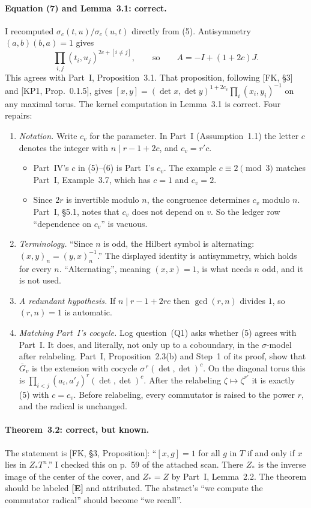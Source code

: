 \documentclass[11pt]{article}
\newcommand{\Gb}{\overline G}
\theoremstyle{definition}
\begin{document}
\paragraph{Equation (7) and Lemma~3.1: correct.} I recomputed
$\sigma_c(t,u)/\sigma_c(u,t)$ directly from (5). Antisymmetry
$(a,b)(b,a)=1$ gives
\[
\prod_{i,j}(t_i,u_j)^{2c+[i\ne j]},\qquad\text{so}\qquad A=-I+(1+2c)J.
\]
This agrees with Part~I, Proposition~3.1. That proposition, following
[FK, \S3] and [KP1, Prop.~0.1.5], gives
$[x,y]=(\det x,\det y)^{1+2c_v}\prod_i(x_i,y_i)^{-1}$ on any maximal
torus. The kernel computation in Lemma~3.1 is correct. Four repairs:
\begin{enumerate}[label=(\alph*)]
\item \emph{Notation.} Write $c_v$ for the parameter. In Part~I
(Assumption~1.1) the letter $c$ denotes the integer with $n\mid r-1+2c$,
and $c_v=r'c$.
\begin{itemize}
\item Part~IV's $c$ in (5)--(6) is Part~I's $c_v$. The example
$c\equiv2\pmod3$ matches Part~I, Example~3.7, which has $c=1$ and $c_v=2$.
\item Since $2r$ is invertible modulo $n$, the congruence determines $c_v$
modulo $n$. Part~I, \S5.1, notes that $c_v$ does not depend on $v$. So
the ledger row ``dependence on $c_v$'' is vacuous.
\end{itemize}
\item \emph{Terminology.} ``Since $n$ is odd, the Hilbert symbol is
alternating: $(x,y)_n=(y,x)_n^{-1}$.'' The displayed identity is
antisymmetry, which holds for every $n$. ``Alternating'', meaning
$(x,x)=1$, is what needs $n$ odd, and it is not used.
\item \emph{A redundant hypothesis.} If $n\mid r-1+2rc$ then $\gcd(r,n)$ divides
$1$, so $(r,n)=1$ is automatic.
\item \emph{Matching Part~I's cocycle.} Log question~(Q1) asks whether
(5) agrees with Part~I. It does, and literally, not only up to a
coboundary, in the $\sigma$-model after relabeling. Part~I,
Proposition~2.3(b) and Step~1 of its proof, show that $\Gb_v$ is the
extension with cocycle $\sigma^{\,r}(\det,\det)^c$. On the diagonal
torus this is $\prod_{i<j}(a_i,a'_j)^r(\det,\det)^c$. After the
relabeling $\zeta\mapsto\zeta^{r'}$ it is exactly (5) with $c=c_v$.
Before relabeling, every commutator is raised to the power $r$, and the
radical is unchanged.
\end{enumerate}

\paragraph{Theorem~3.2: correct, but known.} The statement is
[FK, \S3, Proposition]: ``$[x,g]=1$ for all $g$ in $T$ if and only if $x$
lies in $Z_*T^n$.'' I checked this on p.~59 of the attached scan. There
$Z_*$ is the inverse image of the center of the cover, and $Z_*=Z$ by
Part~I, Lemma~2.2. The theorem should be labeled \textbf{[E]} and
attributed. The abstract's ``we compute the commutator radical'' should
become ``we recall''.
\end{document}
